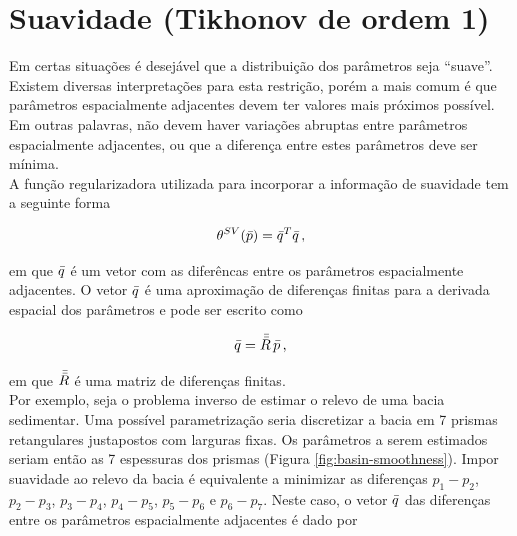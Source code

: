 \section{Suavidade (Tikhonov de ordem 1)}
\label{sec:smoothness}

Em certas situações é desejável que a distribuição dos parâmetros seja ``suave''.
Existem diversas interpretações para esta restrição, porém a mais comum é que
parâmetros espacialmente adjacentes devem ter valores mais próximos possível.
Em outras palavras, não devem haver variações abruptas entre parâmetros
espacialmente adjacentes, ou que a diferença entre estes parâmetros deve ser
mínima.
\\
\indent A função regularizadora utilizada para incorporar a informação de
suavidade tem a seguinte forma

\begin{equation}
\theta^{SV}(\bar{p}) = \bar{q}^T\bar{q} \thinspace ,
\end{equation}

\noindent em que $\bar{q}$ é um vetor com as diferêncas entre os parâmetros
espacialmente adjacentes. O vetor $\bar{q}$ é uma aproximação de diferenças
finitas para a derivada espacial dos parâmetros e pode ser escrito como

\begin{equation}
\bar{q} = \bar{\bar{R}}\thinspace\bar{p} \thinspace ,
\label{eq:vetor_diferencas}
\end{equation}

\noindent em que $\bar{\bar{R}}$ é uma matriz de diferenças finitas.
\\
\indent Por exemplo, seja o problema inverso de estimar o relevo de uma bacia
sedimentar. Uma possível parametrização seria discretizar a bacia em 7 prismas
retangulares justapostos com larguras fixas. Os parâmetros a serem estimados
seriam então as 7 espessuras dos prismas (Figura \ref{fig:basin-smoothness}).
Impor suavidade ao relevo da bacia é equivalente a minimizar as diferenças
$p_1 - p_2$, $p_2 - p_3$, $p_3 - p_4$, $p_4 - p_5$, $p_5 - p_6$ e $p_6 - p_7$.
Neste caso, o vetor $\bar{q}$ das diferenças entre os parâmetros espacialmente
adjacentes é dado por

